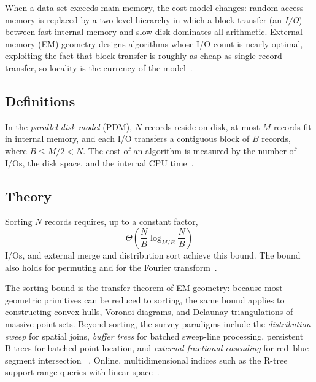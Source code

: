 When a data set exceeds main
memory, the cost model changes: random-access memory is replaced by a
two-level hierarchy in which a block transfer (an \emph{I/O}) between fast
internal memory and slow disk dominates all arithmetic. External-memory (EM)
geometry designs algorithms whose I/O count is nearly optimal, exploiting the
fact that block transfer is roughly as cheap as single-record transfer, so
locality is the currency of the model~\cite{aggarwalvitter1988,vitter2001}.

\subsection{Definitions}

\begin{definition}\label{def:frontiers_io_model}
In the \emph{parallel disk model} (PDM), $N$ records reside on disk, at most
$M$ records fit in internal memory, and each I/O transfers a contiguous block
of $B$ records, where $B \le M/2 < N$. The cost of an algorithm is measured by
the number of I/Os, the disk space, and the internal CPU time~\cite{vitter2001}.
\end{definition}

\subsection{Theory}

\begin{theorem}\label{thm:frontiers_io_sorting}
Sorting $N$ records requires, up to a constant factor,
\[
\Theta\!\left( \frac{N}{B} \log_{M/B} \frac{N}{B} \right)
\]
I/Os, and external merge and distribution sort achieve this bound. The bound
also holds for permuting and for the Fourier transform~\cite{aggarwalvitter1988}.
\end{theorem}

The sorting bound is the transfer theorem of EM geometry: because most
geometric primitives can be reduced to sorting, the same bound applies to
constructing convex hulls, Voronoi diagrams, and Delaunay triangulations of
massive point sets. Beyond sorting, the survey paradigms include the
\emph{distribution sweep} for spatial joins, \emph{buffer trees} for batched
sweep-line processing, persistent B-trees for batched point location, and
\emph{external fractional cascading} for red--blue segment intersection
~\cite{vitter2001}. Online, multidimensional indices such as the R-tree
support range queries with linear space~\cite{guttman1984,beckmann1990}.

